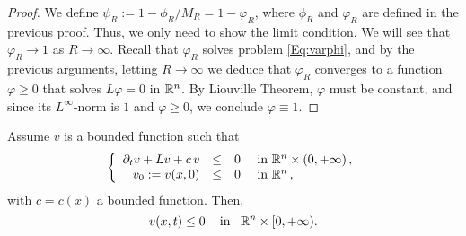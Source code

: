 \begin{proof}
We define $ \psi_R := 1-\phi_R/M_R = 1-\varphi_R$, where $\phi_R$ and $\varphi_R$ are defined in the previous proof. Thus, we only need to show the limit condition. We will see that $\varphi_R \to 1$ as $R\to\infty$. Recall that $\varphi_R$ solves problem \eqref{Eq:varphi}, and by the previous arguments, letting $R\to \infty$ we deduce that $\varphi_R$ converges to a function $\varphi\geq 0$ that solves $ L\varphi = 0 $ in $\mathbb{R}^n$. By Liouville Theorem, $\varphi$ must be constant, and since its $L^\infty$-norm is $1$ and $\varphi\geq 0$, we conclude $\varphi\equiv 1$.
\end{proof}

\begin{theorem}
\label{Th:ParaMaxPrp}
Assume $v$ is a bounded function such that
\begin{equation*}
\left\{\begin{array}{rcll}
\partial_t v + L v + c\,v &\leq& 0 & \textrm{ in }\mathbb{R}^n\times(0,+\infty)\,,\\
v_0:=v(x,0) &\leq& 0 & \textrm{ in } \mathbb{R}^n\,,
\end{array} \right.
\end{equation*}
with $c=c(x)$ a bounded function. Then,
$$ v(x,t) \leq 0 \,\,\,\,\,\text{ in } \,\,\, \mathbb{R}^n\times[0,+\infty). $$
\end{theorem}

